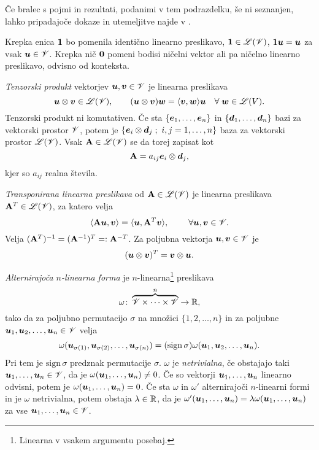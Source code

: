 Če bralec s pojmi in rezultati, podanimi v tem podrazdelku, še ni seznanjen, lahko
pripadajoče dokaze in utemeljitve najde v \cite[str.~233-261]{liu}.

Krepka enica $\mathbf 1$ bo pomenila identično linearno preslikavo, $\mathbf 1\in\mathscr L(\mathscr V)$,
$\mathbf 1\boldsymbol u=\boldsymbol u$ za vsak $\boldsymbol u\in\mathscr V$. Krepka nič $\mathbf 0$ pomeni bodisi
ničelni vektor ali pa ničelno linearno preslikavo, odvisno od konteksta.

\emph{Tenzorski produkt} vektorjev $\boldsymbol u,\boldsymbol v\in\mathscr V$ je linearna preslikava
\[
	\boldsymbol u\otimes\boldsymbol v\in\mathscr L(\mathscr V),\qquad
	(\boldsymbol u\otimes\boldsymbol v)\boldsymbol w=\langle\boldsymbol v,\boldsymbol w\rangle\boldsymbol u\quad\forall\;\boldsymbol w\in\mathscr L(V).
\]
Tenzorski produkt ni komutativen. Če sta $\{\boldsymbol e_1,\dots,\boldsymbol e_n\}$ in
$\{\boldsymbol d_1,\dots,\boldsymbol d_n\}$ bazi za vektorski prostor $\mathscr V$, potem je
$\{\vek{e}_i\otimes\vek{d}_j\;;\ i,j=1,\dots,n\}$ baza za vektorski prostor $\mathscr L(\mathscr V)$.
Vsak $\mathbf A\in\mathscr L(\mathscr V)$ se da torej zapisat kot
\[
	\mathbf A=a_{ij}\boldsymbol e_i\otimes\boldsymbol d_j,
\]
kjer so $a_{ij}$ realna števila.

\emph{Transponirana linearna preslikava} od $\mathbf A\in\mathscr L(\mathscr V)$ je linearna preslikava
$\mathbf A^T\in\mathscr L(\mathscr V)$, za katero velja
\[
	\langle\mathbf A\boldsymbol u,\boldsymbol v\rangle=\langle\boldsymbol u,\mathbf A^T\boldsymbol v\rangle,
	\qquad\;\forall \boldsymbol u,\boldsymbol v\in\mathscr V.
\]
Velja $(\mathbf A^T)^{-1}=(\mathbf A^{-1})^T=:\mathbf A^{-T}$. Za poljubna vektorja $\boldsymbol u,\boldsymbol v\in\mathscr V$ je
\[ (\boldsymbol u\otimes\boldsymbol v)^T=\boldsymbol v\otimes\boldsymbol u. \]

\emph{Alternirajoča $n$-linearna forma} je $n$-linearna\footnote{Linearna v vsakem argumentu posebaj.} preslikava
\[ \omega\colon\overbrace{\mathscr V\times\dots\times\mathscr V}^{n}\to\mathbb R, \]
tako da za poljubno permutacijo $\sigma$ na množici $\{1,2,\dots,n\}$ in za poljubne
$\boldsymbol u_1,\boldsymbol u_2,\dots,\boldsymbol u_n\in\mathscr V$ velja
\[
	\omega(\boldsymbol u_{\sigma(1)},\boldsymbol u_{\sigma(2)},\dots,\boldsymbol u_{\sigma(n)})
	=(\mathrm{sign}\,\sigma)\omega(\boldsymbol u_1,\boldsymbol u_2,\dots,\boldsymbol u_n).
\]
Pri tem je $\mathrm{sign}\,\sigma$ predznak permutacije $\sigma$. $\omega$ je \emph{netrivialna},
če obstajajo taki $\boldsymbol u_1,\dots,\boldsymbol u_n\in\mathscr V$, da je $\omega(\boldsymbol u_1,\dots,\boldsymbol u_n)\neq 0$.
Če so vektorji $\boldsymbol u_1,\dots,\boldsymbol u_n$ linearno odvisni, potem je $\omega(\boldsymbol u_1,\dots,\boldsymbol u_n)=0$.
Če sta $\omega$ in $\omega'$ alternirajoči $n$-linearni formi in je $\omega$ netrivialna, potem
obstaja $\lambda\in\mathbb R$, da je $\omega'(\boldsymbol u_1,\dots,\boldsymbol u_n)=\lambda\omega(\boldsymbol u_1,\dots,\boldsymbol u_n)$
za vse $\boldsymbol u_1,\dots,\boldsymbol u_n\in\mathscr V$.

